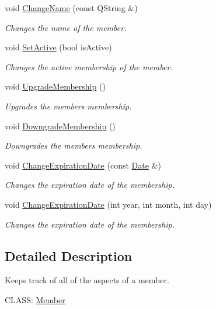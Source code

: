 \begin{DoxyCompactItemize}
void \hyperlink{class_member_a1003f8aaaf3d11141a642fe3a330527d}{Change\+Name} (const Q\+String \&)
\begin{DoxyCompactList}\small\item\em Changes the name of the member. \end{DoxyCompactList}\item 
void \hyperlink{class_member_a00269243882b9e39dacfdcbcc885c307}{Set\+Active} (bool is\+Active)
\begin{DoxyCompactList}\small\item\em Changes the active membership of the member. \end{DoxyCompactList}\item 
void \hyperlink{class_member_a835b9172cfe0a9ab0ad23c8843175562}{Upgrade\+Membership} ()
\begin{DoxyCompactList}\small\item\em Upgrades the member\textquotesingle{}s membership. \end{DoxyCompactList}\item 
void \hyperlink{class_member_a87fe6a012352d66c332c8a4f36c58c0c}{Downgrade\+Membership} ()
\begin{DoxyCompactList}\small\item\em Downgrades the member\textquotesingle{}s membership. \end{DoxyCompactList}\item 
void \hyperlink{class_member_a13fe2db5fd5eee4754c4d55ee0dd7ef5}{Change\+Expiration\+Date} (const \hyperlink{class_date}{Date} \&)
\begin{DoxyCompactList}\small\item\em Changes the expiration date of the membership. \end{DoxyCompactList}\item 
void \hyperlink{class_member_a520c6c140590c66aa2d9b60aada1b684}{Change\+Expiration\+Date} (int year, int month, int day)
\begin{DoxyCompactList}\small\item\em Changes the expiration date of the membership. \end{DoxyCompactList}\end{DoxyCompactItemize}


\subsection{Detailed Description}
Keeps track of all of the aspects of a member. 

C\+L\+A\+SS\+: \hyperlink{class_member}{Member} 

